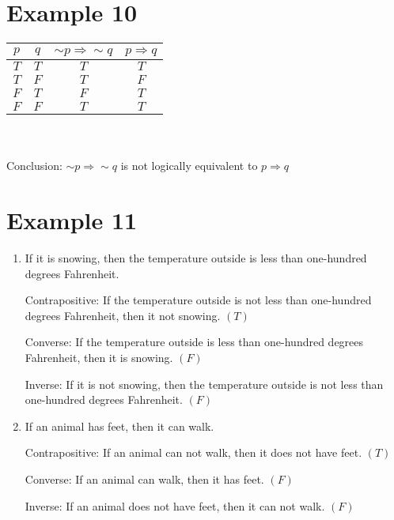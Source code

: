 \documentclass[12pt,a4paper]{article}
\begin{document}
\section*{Example 10}
\begin{tabular}{|c|c|c|c|}
	\hline
	$p$ & $q$ & $\sim p\Rightarrow \sim q$ & $p\Rightarrow q$\\ \hline
	$T$ & $T$ & $T$ & $T$\\ \hline
	$T$ & $F$ & $T$ & $F$\\ \hline
	$F$ & $T$ & $F$ & $T$\\ \hline
	$F$ & $F$ & $T$ & $T$\\ \hline
\end{tabular}
\\\\
Conclusion: $\sim p\Rightarrow \sim q$ is not logically equivalent to $p\Rightarrow q$

\section*{Example 11}
\begin{enumerate}
\item If it is snowing, then the temperature outside is less than one-hundred degrees Fahrenheit.

Contrapositive: If the temperature outside is not less than one-hundred degrees Fahrenheit, then it not snowing. $(T)$

Converse: If the temperature outside is less than one-hundred degrees Fahrenheit, then it is snowing. $(F)$

Inverse: If it is not snowing, then the temperature outside is not less than one-hundred degrees Fahrenheit. $(F)$


\item If an animal has feet, then it can walk.

Contrapositive: If an animal can not walk, then it does not have feet. $(T)$

Converse: If an animal can walk, then it has feet. $(F)$

Inverse: If an animal does not have feet, then it can not walk. $(F)$
\end{enumerate}
\end{document}
